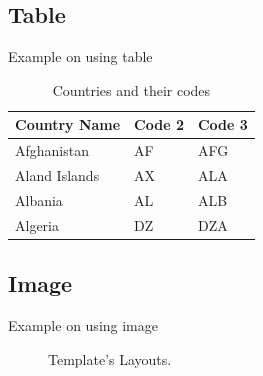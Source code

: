 \documentclass[aspectratio=169,t,xcolor=table]{beamer}
\begin{document}
\subsection{Table}

\begin{frame}{Example on using table}

    \begin{table}[]
        \centering
        \caption{\label{tab:1}Countries and their codes}
        
        \renewcommand{\arraystretch}{1.5}
        \setlength{\tabcolsep}{10pt}
        
        {
            \begin{tabular}{ p{3cm}p{3cm}p{3cm}  }
                \toprule 
                \textbf{Country Name} & \textbf{Code 2} & \textbf{Code 3} \\
                \midrule
                Afghanistan & AF &AFG \\
                Aland Islands & AX   & ALA \\
                Albania &AL & ALB \\
                Algeria    &DZ & DZA \\
                \bottomrule
            \end{tabular}
        }
    \end{table}
    
\end{frame}

\subsection{Image}

\begin{frame}{Example on using image}

    \begin{figure}
        \centering
        \caption{Template's Layouts.}
        \label{fig:layouts}
    \end{figure}
    
\end{frame}


\end{document}
